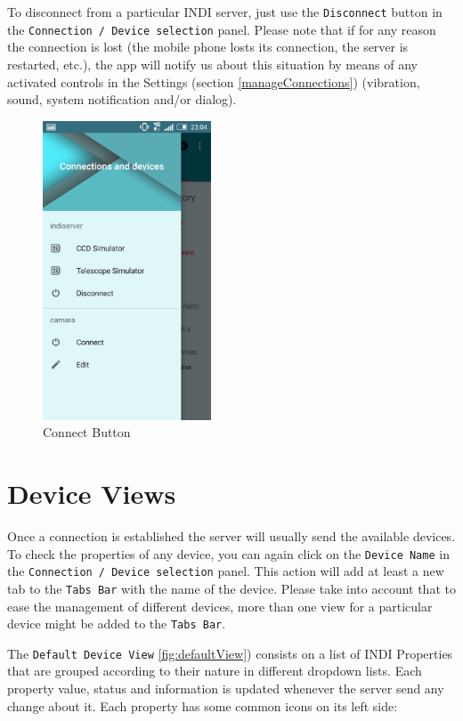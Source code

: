 To disconnect from a particular INDI server, just use the \texttt{Disconnect} button in the \texttt{Connection / Device selection} panel. Please note that if for any reason the connection is lost (the mobile phone losts its connection, the server is restarted, etc.), the app will notify us about this situation by means of any activated controls in the Settings (section \ref{manageConnections}) (vibration, sound, system notification and/or dialog).



\begin{figure}
 \centering
 \includegraphics[width=5cm]{../images/connectionAndDevicesPanel2.png}
 \caption{Connect Button}
 \label{fig:connectButton}
\end{figure}




\section{Device Views}

Once a connection is established the server will usually send the available devices. To check the properties of any device, you can again click on the \texttt{Device Name} in the \texttt{Connection / Device selection} panel. This action will add at least a new tab to the \texttt{Tabs Bar} with the name of the device. Please take into account that to ease the management of different devices, more than one view for a particular device might be added to the \texttt{Tabs Bar}.

The \texttt{Default Device View} \ref{fig:defaultView}) consists on a list of INDI Properties that are grouped according to their nature in different  dropdown lists. Each property value, status and information is updated whenever the server send any change about it. Each property has some common icons on its left side:


